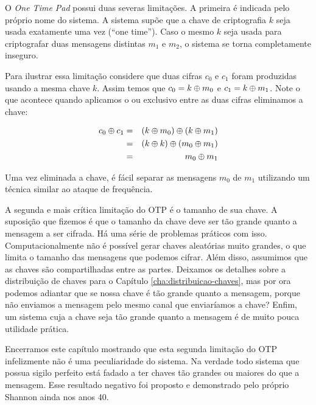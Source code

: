O {\em One Time Pad} possui duas severas limitações.
A primeira é indicada pelo próprio nome do sistema.
A sistema supõe que a chave de criptografia $k$ seja usada exatamente uma vez (``one time'').
Caso o mesmo $k$ seja usada para criptografar duas mensagens distintas $m_1$ e $m_2$, o sistema se torna completamente inseguro.

Para ilustrar essa limitação considere que duas cifras $c_0$ e $c_1$ foram produzidas usando a mesma chave $k$.
Assim temos que $c_0 = k \oplus m_0$ e $c_1 = k \oplus m_1$.
Note o que acontece quando aplicamos o ou exclusivo entre as duas cifras eliminamos a chave:


\begin{eqnarray*}
  c_0 \oplus c_1 & = & (k \oplus m_0) \oplus (k \oplus m_1)\\
              & = & (k \oplus k) \oplus (m_0 \oplus m_1)\\
              & = & m_0 \oplus m_1
\end{eqnarray*}

Uma vez eliminada a chave, é fácil separar as mensagens $m_0$ de $m_1$ utilizando um técnica similar ao ataque de frequência.

A segunda e mais crítica limitação do OTP é o tamanho de sua chave.
A suposição que fizemos é que o tamanho da chave deve ser tão grande quanto a mensagem a ser cifrada.
Há uma série de problemas práticos com isso.
Computacionalmente não é possível gerar chaves aleatórias muito grandes, o que limita o tamanho das mensagens que podemos cifrar.
Além disso, assumimos que as chaves são compartilhadas entre as partes.
Deixamos os detalhes sobre a distribuição de chaves para o Capítulo \ref{cha:distribuicao-chaves}, mas por ora podemos adiantar que se nossa chave é tão grande quanto a mensagem, porque não enviamos a mensagem pelo mesmo canal que enviaríamos a chave?
Enfim, um sistema cuja a chave seja tão grande quanto a mensagem é de muito pouca utilidade prática.

Encerramos este capítulo mostrando que esta segunda limitação do OTP infelizmente não é uma peculiaridade do sistema.
Na verdade todo sistema que possua sigilo perfeito está fadado a ter chaves tão grandes ou maiores do que a mensagem.
Esse resultado negativo foi proposto e demonstrado pelo próprio Shannon ainda nos anos 40.


